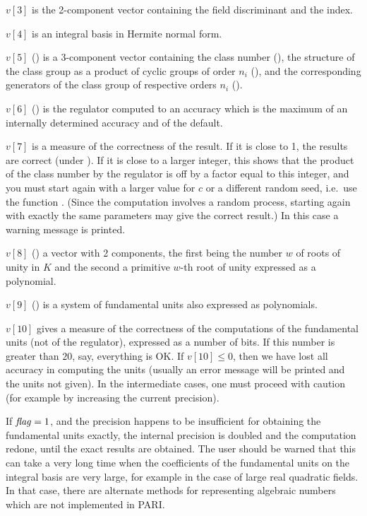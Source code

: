  $v[3]$ is the 2-component vector containing the field discriminant and the
index.

 $v[4]$ is an integral basis in Hermite normal form.

 $v[5]$ () is a 3-component vector containing the class number
(), the structure of the class group as a product of cyclic
groups of order $n_i$ (), and the corresponding generators
of the class group of respective orders $n_i$ ().

 $v[6]$ () is the regulator computed to an accuracy which is the
maximum of an internally determined accuracy and of the default.

 $v[7]$ is a measure of the correctness of the result. If it is close to 1,
the results are correct (under ). If it is close to a larger integer,
this shows that the product of the class number by the regulator is off by a
factor equal to this integer, and you must start again with a larger value
for $c$ or a different random seed, i.e.~use the function .
(Since the computation involves a random process, starting again with exactly
the same parameters may give the correct result.) In this case a warning
message is printed.

 $v[8]$ () a vector with 2 components, the first being the number
$w$ of roots of unity in $K$ and the second a primitive $w$-th root of unity
expressed as a polynomial.

 $v[9]$ () is a system of fundamental units also expressed as
polynomials.

 $v[10]$ gives a measure of the correctness of the computations of the
fundamental units (not of the regulator), expressed as a number of bits. If
this number is greater than $20$, say, everything is OK. If $v[10]\le0$,
then we have lost all accuracy in computing the units (usually an error
message will be printed and the units not given). In the intermediate cases,
one must proceed with caution (for example by increasing the current
precision).

If $\hbox{\it f\kern0pt lag\/}=1$, and the precision happens to be insufficient for obtaining the
fundamental units exactly, the internal precision is doubled and the
computation redone, until the exact results are obtained. The user should be
warned that this can take a very long time when the coefficients of the
fundamental units on the integral basis are very large, for example in the
case of large real quadratic fields. In that case, there are alternate
methods for representing algebraic numbers which are not implemented in PARI.

